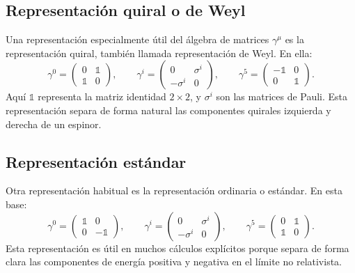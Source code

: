 \documentclass[a4paper,11pt]{book} %
\begin{document}
\subsection{Representación quiral o de Weyl}
\noindent
Una representación especialmente útil del álgebra de matrices \(\gamma^\mu\)
es la representación quiral, también llamada representación de Weyl. En ella:
\begin{equation}
    \gamma^0
    =
    \begin{pmatrix}
        0 & \mathbb{1} \\
        \mathbb{1} & 0
    \end{pmatrix},
    \qquad
    \gamma^i
    =
    \begin{pmatrix}
        0 & \sigma^i \\
        -\sigma^i & 0
    \end{pmatrix},
    \qquad
    \gamma^5
    =
    \begin{pmatrix}
        -\mathbb{1} & 0 \\
        0 & \mathbb{1}
    \end{pmatrix}.
\end{equation}
\noindent
Aquí \(\mathbb{1}\) representa la matriz identidad \(2\times 2\), y
\(\sigma^i\) son las matrices de Pauli. Esta representación separa de forma
natural las componentes quirales izquierda y derecha de un espinor.

\subsection{Representación estándar}
\noindent
Otra representación habitual es la representación ordinaria o estándar. En
esta base:
\begin{equation}
    \gamma^0
    =
    \begin{pmatrix}
        \mathbb{1} & 0 \\
        0 & -\mathbb{1}
    \end{pmatrix},
    \qquad
    \gamma^i
    =
    \begin{pmatrix}
        0 & \sigma^i \\
        -\sigma^i & 0
    \end{pmatrix},
    \qquad
    \gamma^5
    =
    \begin{pmatrix}
        0 & \mathbb{1} \\
        \mathbb{1} & 0
    \end{pmatrix}.
\end{equation}
Esta representación es útil en muchos cálculos explícitos porque separa de
forma clara las componentes de energía positiva y negativa en el límite no
relativista.
\end{document}
